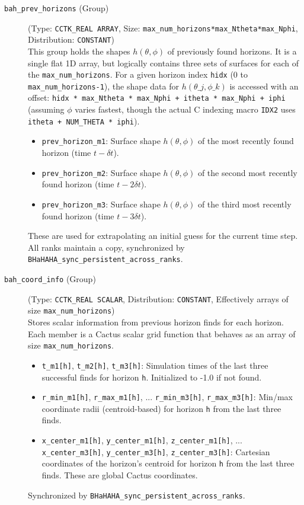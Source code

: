 \documentclass[a4paper,11pt]{article}
\begin{document}
\begin{description}
    \item[\texttt{bah\_prev\_horizons} (Group)] (Type: \texttt{CCTK\_REAL ARRAY}, Size: \texttt{max\_num\_horizons*max\_Ntheta*max\_Nphi}, Distribution: \texttt{CONSTANT}) \\
        This group holds the shapes $h(\theta, \phi)$ of previously found horizons. It is a single flat 1D array, but logically contains three sets of surfaces for each of the \texttt{max\_num\_horizons}. For a given horizon index \texttt{hidx} (0 to \texttt{max\_num\_horizons-1}), the shape data for $h(\theta\_j, \phi\_k)$ is accessed with an offset: \texttt{hidx * max\_Ntheta * max\_Nphi + itheta * max\_Nphi + iphi} (assuming $\phi$ varies fastest, though the actual C indexing macro \texttt{IDX2} uses \texttt{itheta + NUM\_THETA * iphi}).
        \begin{itemize}
            \item \texttt{prev\_horizon\_m1}: Surface shape $h(\theta, \phi)$ of the most recently found horizon (time $t-\delta t$).
            \item \texttt{prev\_horizon\_m2}: Surface shape $h(\theta, \phi)$ of the second most recently found horizon (time $t-2\delta t$).
            \item \texttt{prev\_horizon\_m3}: Surface shape $h(\theta, \phi)$ of the third most recently found horizon (time $t-3\delta t$).
        \end{itemize}
        These are used for extrapolating an initial guess for the current time step. All ranks maintain a copy, synchronized by \texttt{BHaHAHA\_sync\_persistent\_across\_ranks}.

    \item[\texttt{bah\_coord\_info} (Group)] (Type: \texttt{CCTK\_REAL SCALAR}, Distribution: \texttt{CONSTANT}, Effectively arrays of size \texttt{max\_num\_horizons}) \\
        Stores scalar information from previous horizon finds for each horizon. Each member is a Cactus scalar grid function that behaves as an array of size \texttt{max\_num\_horizons}.
        \begin{itemize}
            \item \texttt{t\_m1[h]}, \texttt{t\_m2[h]}, \texttt{t\_m3[h]}: Simulation times of the last three successful finds for horizon \texttt{h}. Initialized to -1.0 if not found.
            \item \texttt{r\_min\_m1[h]}, \texttt{r\_max\_m1[h]}, ... \texttt{r\_min\_m3[h]}, \texttt{r\_max\_m3[h]}: Min/max coordinate radii (centroid-based) for horizon \texttt{h} from the last three finds.
            \item \texttt{x\_center\_m1[h]}, \texttt{y\_center\_m1[h]}, \texttt{z\_center\_m1[h]}, ... \texttt{x\_center\_m3[h]}, \texttt{y\_center\_m3[h]}, \texttt{z\_center\_m3[h]}: Cartesian coordinates of the horizon's centroid for horizon \texttt{h} from the last three finds. These are global Cactus coordinates.
        \end{itemize}
        Synchronized by \texttt{BHaHAHA\_sync\_persistent\_across\_ranks}.


\end{description}
\end{document}
